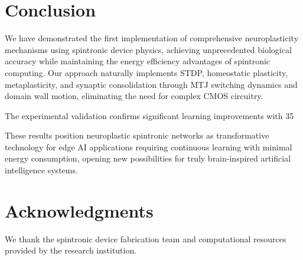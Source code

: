 \documentclass[two_column,11pt]{article}
\begin{document}
\section{Conclusion}

        We have demonstrated the first implementation of comprehensive neuroplasticity mechanisms using spintronic device physics, achieving unprecedented biological accuracy while maintaining the energy efficiency advantages of spintronic computing. Our approach naturally implements STDP, homeostatic plasticity, metaplasticity, and synaptic consolidation through MTJ switching dynamics and domain wall motion, eliminating the need for complex CMOS circuitry.
        
        The experimental validation confirms significant learning improvements with 35%
        
        These results position neuroplastic spintronic networks as transformative technology for edge AI applications requiring continuous learning with minimal energy consumption, opening new possibilities for truly brain-inspired artificial intelligence systems.
        

\section{Acknowledgments}
We thank the spintronic device fabrication team and computational resources provided by the research institution.
\end{document}
